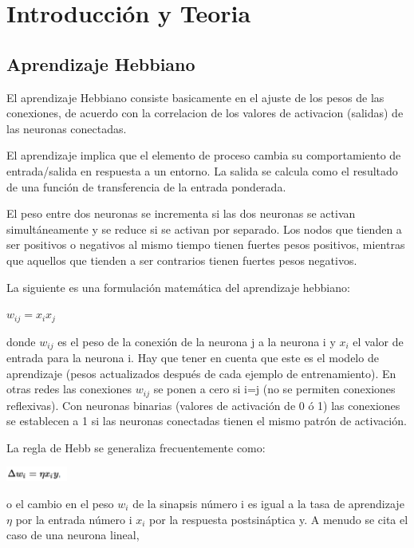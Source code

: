 \section{Introducción y Teoria}
\subsection{Aprendizaje Hebbiano}

El aprendizaje Hebbiano consiste basicamente en el ajuste de los pesos de las conexiones, de acuerdo con la correlacion de los valores de activacion (salidas) de las neuronas conectadas.

El aprendizaje implica que el elemento de proceso cambia su comportamiento de entrada/salida en respuesta a un entorno. La salida se calcula como el resultado de una función de transferencia de la entrada ponderada.

El peso entre dos neuronas se incrementa si las dos neuronas se activan simultáneamente y se reduce si se activan por separado. Los nodos que tienden a ser positivos o negativos al mismo tiempo tienen fuertes pesos positivos, mientras que aquellos que tienden a ser contrarios tienen fuertes pesos negativos.

La siguiente es una formulación matemática del aprendizaje hebbiano:

$w_{ij} = x_i x_j$

donde $w_{ij}$ es el peso de la conexión de la neurona j a la neurona i y $x_{i}$ el valor de entrada para la neurona i. Hay que tener en cuenta que este es el modelo de aprendizaje (pesos actualizados después de cada ejemplo de entrenamiento). En otras redes las conexiones $w_{ij}$ se ponen a cero si  i=j  (no se permiten conexiones reflexivas). Con neuronas binarias (valores de activación de 0 ó 1) las conexiones se establecen a 1 si las neuronas conectadas tienen el mismo patrón de activación.

La regla de Hebb se generaliza frecuentemente como:

\begin{center}
\includegraphics[width=0.15\textwidth]{img/formula1}
\end{center}

o el cambio en el peso $w_{i}$ de la sinapsis número i es igual a la tasa de aprendizaje $\eta$   por la entrada número i $x_{i}$ por la respuesta postsináptica  y. A menudo se cita el caso de una neurona lineal,

